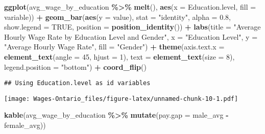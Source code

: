 \documentclass[
]{article}
\newenvironment{Shaded}{\begin{snugshade}}{\end{snugshade}}
\newcommand{\AttributeTok}[1]{\textcolor[rgb]{0.13,0.29,0.53}{#1}}
\newcommand{\ConstantTok}[1]{\textcolor[rgb]{0.56,0.35,0.01}{#1}}
\newcommand{\DecValTok}[1]{\textcolor[rgb]{0.00,0.00,0.81}{#1}}
\newcommand{\FloatTok}[1]{\textcolor[rgb]{0.00,0.00,0.81}{#1}}
\newcommand{\FunctionTok}[1]{\textcolor[rgb]{0.13,0.29,0.53}{\textbf{#1}}}
\newcommand{\NormalTok}[1]{#1}
\newcommand{\SpecialCharTok}[1]{\textcolor[rgb]{0.81,0.36,0.00}{\textbf{#1}}}
\newcommand{\StringTok}[1]{\textcolor[rgb]{0.31,0.60,0.02}{#1}}
\begin{document}
\begin{Shaded}
\begin{Highlighting}[]
\FunctionTok{ggplot}\NormalTok{(avg\_wage\_by\_education }\SpecialCharTok{\%\textgreater{}\%} \FunctionTok{melt}\NormalTok{(),}
       \FunctionTok{aes}\NormalTok{(}\AttributeTok{x =}\NormalTok{ Education.level, }\AttributeTok{fill =}\NormalTok{ variable)) }\SpecialCharTok{+}
  \FunctionTok{geom\_bar}\NormalTok{(}\FunctionTok{aes}\NormalTok{(}\AttributeTok{y =}\NormalTok{ value), }
           \AttributeTok{stat =} \StringTok{"identity"}\NormalTok{, }
           \AttributeTok{alpha =} \FloatTok{0.8}\NormalTok{,}
           \AttributeTok{show.legend =} \ConstantTok{TRUE}\NormalTok{,}
           \AttributeTok{position =} \FunctionTok{position\_identity}\NormalTok{()) }\SpecialCharTok{+}
  \FunctionTok{labs}\NormalTok{(}\AttributeTok{title =} \StringTok{"Average Hourly Wage Rate by Education Level and Gender"}\NormalTok{,}
       \AttributeTok{x =} \StringTok{"Education Level"}\NormalTok{,}
       \AttributeTok{y =} \StringTok{"Average Hourly Wage Rate"}\NormalTok{,}
       \AttributeTok{fill =} \StringTok{"Gender"}\NormalTok{) }\SpecialCharTok{+}
  \FunctionTok{theme}\NormalTok{(}\AttributeTok{axis.text.x =} \FunctionTok{element\_text}\NormalTok{(}\AttributeTok{angle =} \DecValTok{45}\NormalTok{, }\AttributeTok{hjust =} \DecValTok{1}\NormalTok{),}
        \AttributeTok{text =} \FunctionTok{element\_text}\NormalTok{(}\AttributeTok{size =} \DecValTok{8}\NormalTok{),}
        \AttributeTok{legend.position =} \StringTok{"bottom"}\NormalTok{) }\SpecialCharTok{+}
  \FunctionTok{coord\_flip}\NormalTok{()}
\end{Highlighting}
\end{Shaded}

\begin{verbatim}
## Using Education.level as id variables
\end{verbatim}

\texttt{[image: Wages-Ontario\_files/figure-latex/unnamed-chunk-10-1.pdf]}

\begin{Shaded}
\begin{Highlighting}[]
\FunctionTok{kable}\NormalTok{(avg\_wage\_by\_education }\SpecialCharTok{\%\textgreater{}\%}
  \FunctionTok{mutate}\NormalTok{(}\AttributeTok{pay.gap =}\NormalTok{ male\_avg }\SpecialCharTok{{-}}\NormalTok{ female\_avg))}
\end{Highlighting}
\end{Shaded}
\end{document}
